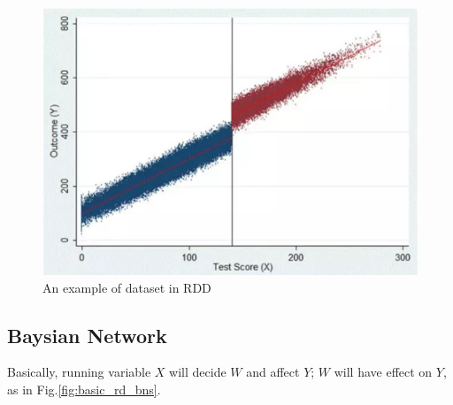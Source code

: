 \documentclass[a4 paper,12pt]{article}
\begin{document}
\begin{figure}[h]
	\centering
   \includegraphics[scale=1]{RDDintro.jpg}
   \caption{An example of dataset in RDD}
   \label{fig:rddintro}
\end{figure}

\subsection{Baysian Network}
Basically, running variable $X$ will decide $W$ and affect $Y$; $W$ will have effect on $Y$, as in Fig.\ref{fig:basic_rd_bns}.
\end{document}
